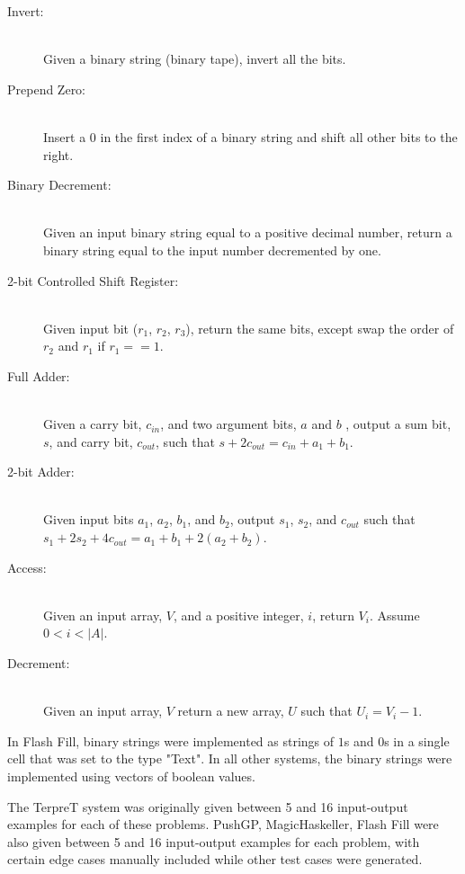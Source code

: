 \begin{description}

\item[Invert:]  \ \\
Given a binary string (binary tape), invert all the bits. 

\item[Prepend Zero:] \ \\
Insert a $0$ in the first index of a binary string and shift all other bits to the right.

\item[Binary Decrement:] \ \\
Given an input binary string equal to a positive decimal number, return a binary string equal to the input number decremented by one.

\item[2-bit Controlled Shift Register:] \ \\
Given input bit ($r_1$, $r_2$, $r_3$), return the same bits, except swap the order of $r_2$ and $r_1$ if $r_1 == 1$.

\item[Full Adder:] \ \\
Given a carry bit, $c_{in}$, and two argument bits, $a$ and $b$ , output a sum bit, $s$, and carry bit, $c_{out}$, such that  $s + 2c_{out} = c_{in} + a_1 + b_1$.

\item[2-bit Adder:] \ \\
Given input bits $a_1$, $a_2$, $b_1$, and $b_2$, output $s_1$, $s_2$, and $c_{out}$ such that  $s_1 + 2s_2 + 4c_{out} = a_1 + b_1 + 2(a_2 + b_2)$.

\item[Access:] \ \\
Given an input array, $V$, and a positive integer, $i$, return $V_i$. Assume $0 < i < |A|$.

\item[Decrement:] \ \\
Given an input array, $V$ return a new array, $U$ such that $U_i = V_i - 1$.

\end{description}

In Flash Fill, binary strings were implemented as strings of $1$s and $0$s in a single cell that was set to the type "Text". In all other systems, the binary strings were implemented using vectors of boolean values.

The TerpreT system was originally given between 5 and 16 input-output examples for each of these problems. PushGP, MagicHaskeller, Flash Fill were also given between 5 and 16 input-output examples for each problem, with certain edge cases manually included while other test cases were generated.


